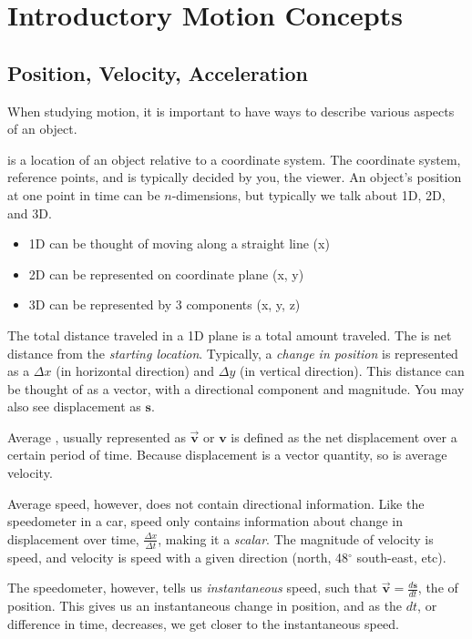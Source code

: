 \chapter{Introductory Motion Concepts}
\section{Position, Velocity, Acceleration}

When studying motion, it is important to have ways to describe various aspects of an object. 

 is a location of an object relative to a coordinate system. The coordinate system, reference points, and  is typically decided by you, the viewer. An object's position at one point in time can be $n$-dimensions, but typically we talk about 1D, 2D, and 3D.

\begin{itemize}
    \item 1D can be thought of moving along a straight line (x)
    \item 2D can be represented on coordinate plane (x, y)
    \item 3D can be represented by 3 components (x, y, z)
\end{itemize}

The total distance traveled in a 1D plane is a total amount traveled. The  is net distance from the \emph{starting location}. Typically, a \emph{change in position} is represented as a $\Delta x$ (in horizontal direction) and $\Delta y$  (in vertical direction). This distance can be thought of as a vector, with a directional component and magnitude. You may also see displacement as $\mathbf s$.


Average , usually represented as $\vec{\mathbf{v}}$ or $\mathbf{v}$ is defined as the net displacement over a certain period of time. Because displacement is a vector quantity, so is average velocity. 

Average speed, however, does not contain directional information. Like the speedometer in a car, speed only contains information about change in displacement over time, $\tfrac{\Delta x}{\Delta t}$, making it a \emph{scalar}. The magnitude of velocity is speed, and velocity is speed with a given direction (north, 48$^\circ$ south-east, etc). 

The speedometer, however, tells us \emph{instantaneous} speed, such that $\vec{\mathbf{v}} = \tfrac{d\mathbf{s}}{dt}$, the  of position. This gives us an instantaneous change in position, and as the $dt$, or difference in time, decreases, we get closer to the instantaneous speed. 

